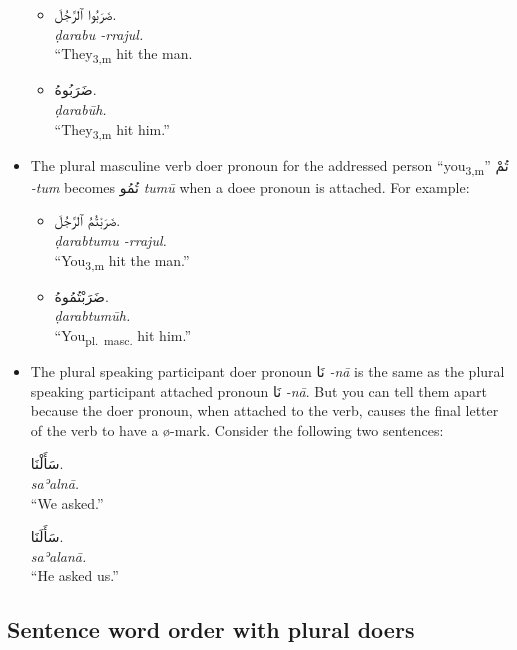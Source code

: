\documentclass[
  10pt,
]{book}
\providecommand{\tightlist}{%
  \setlength{\itemsep}{0pt}\setlength{\parskip}{0pt}}
\begin{document}
\begin{itemize}
  \begin{itemize}
  \tightlist
  \item
    \foreignlanguage{arabic}{ضَرَبُوا ٱلرَّجُلَ.}\\
    \emph{ḍarabu -rrajul.}\\
    ``They\textsubscript{3,m} hit the man.
  \item
    \foreignlanguage{arabic}{ضَرَبُوهُ.}\\
    \emph{ḍarabūh.}\\
    \enquote{They\textsubscript{3,m} hit him.}
  \end{itemize}
\item
  The plural masculine verb doer pronoun for the addressed person \enquote{you\textsubscript{3,m}} \foreignlanguage{arabic}{تُمْ} \emph{-tum} becomes \foreignlanguage{arabic}{تُمُو} \emph{tumū} when a doee pronoun is attached. For example:

  \begin{itemize}
  \tightlist
  \item
    \foreignlanguage{arabic}{ضَرَبْتُمُ ٱلرَّجُلَ.}\\
    \emph{ḍarabtumu -rrajul.}\\
    \enquote{You\textsubscript{3,m} hit the man.}
  \item
    \foreignlanguage{arabic}{ضَرَبْتُمُوهُ.}\\
    \emph{ḍarabtumūh.}\\
    \enquote{You\textsubscript{pl.~masc.} hit him.}
  \end{itemize}
\item
  The plural speaking participant doer pronoun \foreignlanguage{arabic}{نَا} \emph{-nā} is the same as the plural speaking participant attached pronoun \foreignlanguage{arabic}{نَا} \emph{-nā}. But you can tell them apart because the doer pronoun, when attached to the verb, causes the final letter of the verb to have a ø-mark. Consider the following two sentences:

  \foreignlanguage{arabic}{سَأَلْنَا.}\\
  \emph{saʾalnā.}\\
  \enquote{We asked.}

  \foreignlanguage{arabic}{سَأَلَنَا.}\\
  \emph{saʾalanā.}\\
  \enquote{He asked us.}
\end{itemize}

\subsection{Sentence word order with plural doers}\label{sentence-word-order-with-plural-doers}
\end{document}
